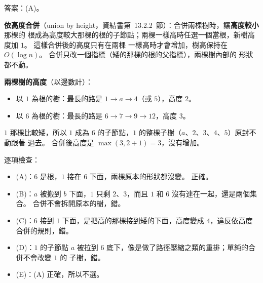 \begin{pastsoln}
答案：(A)。

\textbf{依高度合併}（union by height，資結書第~13.2.2~節）：合併兩棵樹時，讓\textbf{高度較小}那棵的
根成為高度較大那棵的根的子節點；兩棵一樣高時任選一個當根，新樹高度加 $1$。 這樣合併後的高度只有在兩棵
一樣高時才會增加，樹高保持在 $O(\log n)$。 合併只改一個指標（矮的那棵的根的父指標），兩棵樹內部的
形狀都不動。

\textbf{兩棵樹的高度}（以邊數計）：
\begin{itemize}
\item 以 $1$ 為根的樹：最長的路是 $1 \to a \to 4$（或 $5$），高度 $2$。
\item 以 $6$ 為根的樹：最長的路是 $6 \to 7 \to 9 \to 12$，高度 $3$。
\end{itemize}
$1$ 那棵比較矮，所以 $1$ 成為 $6$ 的子節點，$1$ 的整棵子樹（$a$、$2$、$3$、$4$、$5$）原封不動跟著
過去。 合併後高度是 $\max(3, 2 + 1) = 3$，沒有增加。

逐項檢查：
\begin{itemize}
\item (A)：$6$ 是根，$1$ 接在 $6$ 下面，兩棵原本的形狀都沒變。 正確。
\item (B)：$a$ 被搬到 $b$ 下面，$1$ 只剩 $2$、$3$，而且 $1$ 和 $6$ 沒有連在一起，還是兩個集合。
合併不會拆開原本的樹，錯。
\item (C)：$6$ 接到 $1$ 下面，是把高的那棵接到矮的下面，高度變成 $4$，違反依高度合併的規則，錯。
\item (D)：$1$ 的子節點 $a$ 被拉到 $6$ 底下，像是做了路徑壓縮之類的重排；單純的合併不會改變 $1$ 的
子樹，錯。
\item (E)：(A) 正確，所以不選。
\end{itemize}
\end{pastsoln}
